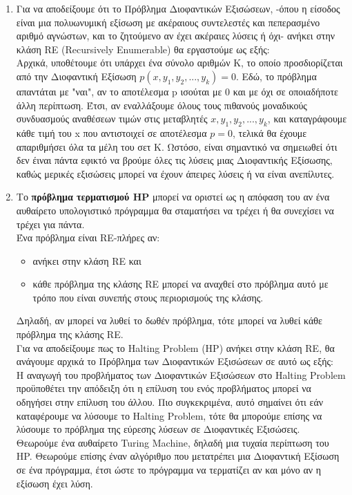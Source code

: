 \documentclass{article}
\begin{document}
\begin{enumerate}[label=(\alph*)]
\item Για να αποδείξουμε ότι το Πρόβλημα Διοφαντικών Εξισώσεων, -όπου η είσοδος είναι μια πολυωνυμική εξίσωση με ακέραιους συντελεστές και πεπερασμένο αριθμό αγνώστων, και το ζητούμενο αν έχει ακέραιες λύσεις ή όχι- ανήκει στην κλάση RE (Recursively Enumerable) θα εργαστούμε ως εξής: 
\\
Αρχικά, υποθέτουμε ότι υπάρχει ένα σύνολο αριθμών Κ, το οποίο προσδιορίζεται από την Διοφαντική Εξίσωση $p(x, y_1, y_2, ...,y_k)=0$. Εδώ, το πρόβλημα απαντάται με "ναι", αν το αποτέλεσμα p ισούται με 0 και με όχι σε οποιαδήποτε άλλη περίπτωση. Έτσι, αν εναλλάξουμε όλους τους πιθανούς μοναδικούς συνδυασμούς αναθέσεων τιμών στις μεταβλητές $x, y_1, y_2, ..., y_k$, και καταγράφουμε κάθε τιμή του x που αντιστοιχεί σε αποτέλεσμα $p=0$, τελικά θα έχουμε απαριθμήσει όλα τα μέλη του σετ Κ.  Ωστόσο, είναι σημαντικό να σημειωθεί ότι δεν έιναι πάντα εφικτό να βρούμε όλες τις λύσεις μιας Διοφαντικής Εξίσωσης, καθώς μερικές εξισώσεις μπορεί να έχουν άπειρες λύσεις ή να είναι ανεπίλυτες. 
\item Το \textbf{πρόβλημα τερματισμού HP} μπορεί να οριστεί ως η απόφαση του αν ένα αυθαίρετο υπολογιστικό πρόγραμμα θα σταματήσει να τρέχει ή θα συνεχίσει να τρέχει για πάντα. \\
Ένα πρόβλημα είναι RE-πλήρες αν:
\begin{itemize}
\item ανήκει στην κλάση RE και 
\item κάθε πρόβλημα της κλάσης RE μπορεί να αναχθεί στο πρόβλημα αυτό με τρόπο που είναι συνεπής στους περιορισμούς της κλάσης.
\end{itemize}
Δηλαδή, αν μπορεί να λυθεί το δωθέν πρόβλημα, τότε μπορεί να λυθεί κάθε πρόβλημα της κλάσης RE. \\
Για να αποδείξουμε πως το Halting Problem (HP) ανήκει στην κλάση RE, θα ανάγουμε αρχικά το Πρόβλημα των Διοφαντικών Εξισώσεων σε αυτό ως εξής: 
\\
Η αναγωγή του προβλήματος των Διοφαντικών Εξισώσεων στο Halting Problem προϋποθέτει την απόδειξη ότι η επίλυση του ενός προβλήματος μπορεί να οδηγήσει στην επίλυση του άλλου. Πιο συγκεκριμένα, αυτό σημαίνει ότι εάν καταφέρουμε να λύσουμε το Halting Problem, τότε θα μπορούμε επίσης να λύσουμε το πρόβλημα της εύρεσης λύσεων σε Διοφαντικές Εξισώσεις. 
\\
Θεωρούμε ένα αυθαίρετο Turing Machine, δηλαδή μια τυχαία περίπτωση του HP. Θεωρούμε επίσης έναν αλγόριθμο που μετατρέπει μια Διοφαντική Εξίσωση σε ένα πρόγραμμα, έτσι ώστε το πρόγραμμα να τερματίζει αν και μόνο αν η εξίσωση έχει λύση. \\

\end{enumerate}
\end{document}
